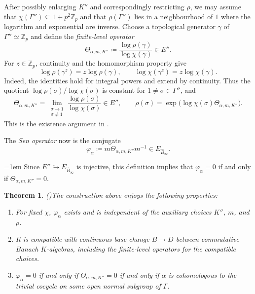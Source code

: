 \documentclass[10pt,twoside]{article}
\numberwithin{equation}{section}
\theoremstyle{plain}
\newtheorem{mythm}{Theorem}[section]
\theoremstyle{definition}
\newcommand{\ZZ}{\mathbb{Z}}
\let \phi \varphi
\begin{document}
After possibly enlarging \(K''\) and correspondingly restricting \(\rho\), we may assume that \(\chi(\Gamma'')\subseteq1+p^2\ZZ_p\) and that \(\rho(\Gamma'')\) lies in a neighbourhood of \(1\) where the logarithm and exponential are inverse. Choose a topological generator \(\gamma\) of \(\Gamma''\simeq\ZZ_p\) and define the \emph{finite-level operator}
\begin{equation*}
\Theta_{\alpha,m,K''}\coloneqq
\frac{\log\rho(\gamma)}{\log\chi(\gamma)}\in E''.
\end{equation*}
For \(z\in\ZZ_p\), continuity and the homomorphism property give
\[
\log\rho(\gamma^z)=z\log\rho(\gamma),\qquad
\log\chi(\gamma^z)=z\log\chi(\gamma).
\]
Indeed, the identities hold for integral powers and extend by continuity. Thus the quotient \(\log\rho(\sigma)/\log\chi(\sigma)\) is constant for \(1\ne\sigma\in\Gamma''\), and
\[
\Theta_{\alpha,m,K''}=
\lim_{\substack{\sigma\to1\\\sigma\ne1}}
\frac{\log\rho(\sigma)}{\log\chi(\sigma)}\in E'',\qquad
\rho(\sigma)=\exp\bigl(\log\chi(\sigma)\Theta_{\alpha,m,K''}\bigr).
\]
This is the existence argument in \cite[\S2.3, p.~27]{Sen}.

The \emph{Sen operator} now is the conjugate
\begin{equation*}
\phi_\alpha\coloneqq m\Theta_{\alpha,m,K''}m^{-1}
\in E_{\hat B_\infty}.
\end{equation*}

{\emergencystretch=1em Since \(E''\hookrightarrow E_{\hat B_\infty}\) is injective, this definition implies that \(\phi_\alpha=0\) if and only if \(\Theta_{\alpha,m,K''}=0\).\par}

\begin{mythm}\emph{(\cite[\S2.4, 2.5]{Sen})}\label{SenFundamentalThm}
The construction above enjoys the following properties:
\begin{enumerate}
    \item For fixed \(\chi\), \(\phi_\alpha\) exists and is independent of the auxiliary choices \(K''\), \(m\), and \(\rho\).
    \item It is compatible with continuous base change \(B\to D\) between commutative Banach \(K\)-algebras, including the finite-level operators for the compatible choices.
    \item \(\phi_\alpha=0\) if and only if \(\Theta_{\alpha,m,K''}=0\) if and only if \(\alpha\) is cohomologous to the trivial cocycle on some open normal subgroup of \(\Gamma\).
\end{enumerate}
\end{mythm}
\end{document}
